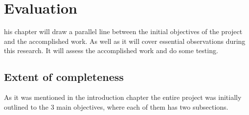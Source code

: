 \let\textcircled=\pgftextcircled
\chapter{Evaluation}
\label{chap:7}
his chapter will draw a parallel line between the initial objectives of the project and the accomplished work. As well as it will cover essential observations during this research. It will assess the accomplished work and do some testing.

\section{Extent of completeness}
\label{subsec:objectives}
As it was mentioned in the introduction chapter the entire project was initially outlined to the 3 main objectives, where each of them has two subsections. 

